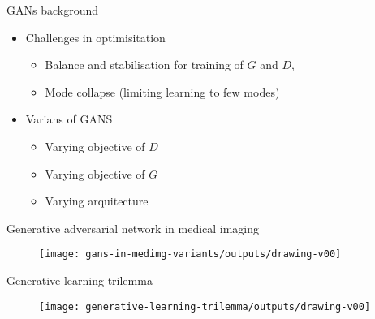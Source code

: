 {

\begin{frame}{GANs background}
\begin{itemize}

\item Challenges in optimisitation
    \begin{itemize}
    \item Balance and stabilisation for training of $G$ and $D$, 
    \item Mode collapse (limiting learning to few modes)
    \end{itemize}

\item Varians of GANS
    \begin{itemize}
    \item Varying objective of $D$
    \item Varying objective of $G$
    \item Varying arquitecture
    \end{itemize}

\end{itemize}

\end{frame}
}



{

\begin{frame}{Generative adversarial network in medical imaging}{}
      \begin{figure}
        \centering
        \texttt{[image: gans-in-medimg-variants/outputs/drawing-v00]}
      \end{figure}
\end{frame}
}


{

\begin{frame}{Generative learning trilemma}{}
      \begin{figure}
        \centering
        \texttt{[image: generative-learning-trilemma/outputs/drawing-v00]}
      \end{figure}
\end{frame}
}





